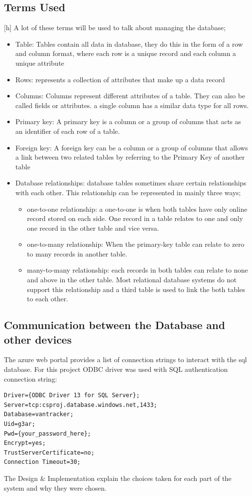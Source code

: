 \subsection{Terms Used}[h]
A lot of these terms will be used to talk about managing the database;
\begin{itemize}
\item Table: Tables contain all data in database, they do this in the form of a row and column format, where each row is a unique record and each column a unique attribute
\item Rows: represents a collection of attributes that make up a data record
\item Columns: Columns represent different attributes of a table. They can also be called fields or attributes. a single column has a similar data type for all rows.
\item Primary key: A primary key is a column or a group of columns that acts as an identifier of each row of a table.
\item Foreign key: A foreign key can be a column or a group of columns that allows a link between two related tables by referring to the Primary Key of another table
\item Database relationships: database tables sometimes share certain relationships with each other. This relationship can be represented in mainly three ways;
 \begin{itemize}
   \item one-to-one relationship: a one-to-one is when both tables have only online record stored on each side. One record in a table relates to one and only one record in the other table and vice versa.
   \item one-to-many relationship: When the primary-key table can relate to zero to many records in another table.
   \item many-to-many relationship: each records in both tables can relate to none and above in the other table.\label{manytomany} Most relational database systems do not support this relationship and a third table is used to link the both tables to each other.
\end{itemize}
\end{itemize}
 
 
 
\subsection{Communication between the Database and other devices}
The azure web portal provides a list of connection strings to interact with the sql database. For this project ODBC driver was used with SQL authentication connection string:
\begin{verbatim}
Driver={ODBC Driver 13 for SQL Server};
Server=tcp:csproj.database.windows.net,1433;
Database=vantracker;
Uid=g3ar;
Pwd={your_password_here};
Encrypt=yes;
TrustServerCertificate=no;
Connection Timeout=30;
\end{verbatim}
 
 The Design \& Implementation explain the choices taken for each part of the system and why they were chosen.
 
 

